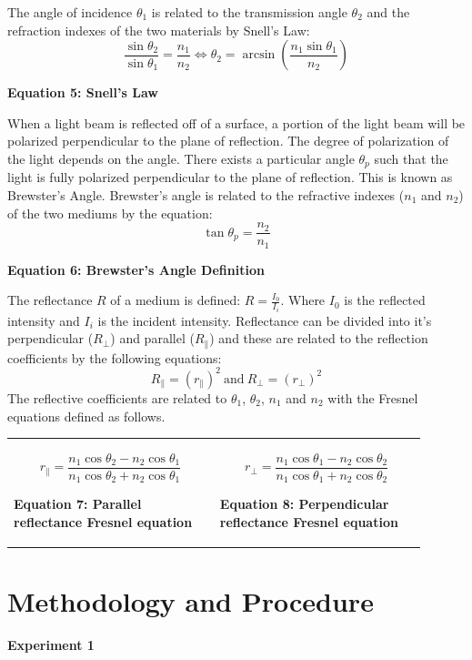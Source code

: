 \documentclass[
	letterpaper, %
	10pt, %
]{CSUniSchoolLabReport}
\begin{document}
The angle of incidence $\theta_1$ is related to the transmission angle $\theta_2$ and the refraction indexes of the two materials by Snell's Law:
$$\frac{\sin\theta_2}{\sin\theta_1} = \frac{n_1}{n_2} \iff \theta_2 = \arcsin\left(\frac{n_1\sin\theta_1}{n_2}\right)$$
\begin{center}
	\textbf{Equation 5: Snell's Law}
\end{center}

When a light beam is reflected off of a surface, a portion of the light beam will be polarized
perpendicular to the plane of reflection. The degree of polarization of the light depends
on the angle. There exists a particular angle $\theta_p$ such that the light is fully
polarized perpendicular to the plane of reflection. This is known as Brewster's Angle. Brewster's
angle is related to the refractive indexes ($n_1$ and $n_2$) of the two mediums by the equation:
$$\tan\theta_p = \frac{n_2}{n_1}$$
\begin{center}
	\textbf{Equation 6: Brewster's Angle Definition}
\end{center}

The reflectance $R$ of a medium is defined: $R = \frac{I_0}{I_i}$. Where $I_0$ is the reflected
intensity and $I_i$ is the incident intensity. Reflectance can be divided into it's
perpendicular ($R_\perp$) and parallel ($R_\parallel$) and these are related to the reflection coefficients by the following equations:
$$R_\parallel =(r_\parallel)^2\  \mathrm{and }\ R_\perp = (r_\perp)^2$$
The reflective coefficients are related to $\theta_1$, $\theta_2$, $n_1$ and $n_2$ with the Fresnel
equations defined as follows.
\begin{tabular}{p{0.45\linewidth} p{0.45\linewidth}}
	$$ r_\parallel = \frac{n_1\cos\theta_2 - n_2\cos\theta_1}{n_1\cos\theta_2 + n_2\cos\theta_1}$$
	\begin{center}
		\textbf{Equation 7: Parallel reflectance Fresnel equation}
	\end{center}
	&
	$$r_\perp = \frac{n_1\cos\theta_1 - n_2\cos\theta_2}{n_1\cos\theta_1 + n_2\cos\theta_2}$$
	\begin{center}
		\textbf{Equation 8: Perpendicular reflectance Fresnel equation}
	\end{center}\\
\end{tabular}
\newpage
\section{Methodology and Procedure}
\textbf{Experiment 1}\\
\end{document}
